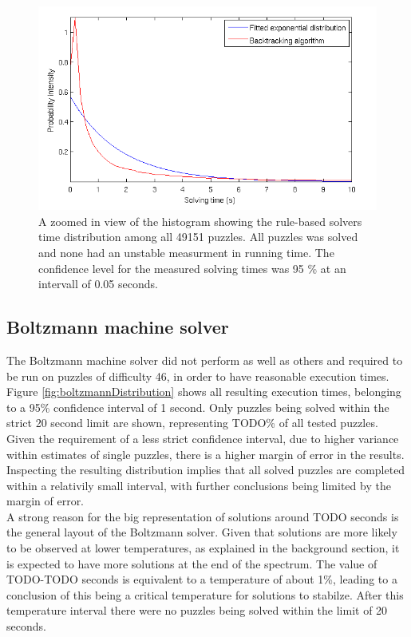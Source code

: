 \documentclass[a4paper,11pt]{kth-mag}
\begin{document}
\begin{figure}[here] 
\centering
\includegraphics[width=16cm]{images/backtrack_exponential.png}
\caption{A zoomed in view of the histogram showing the rule-based solvers time distribution among all 49151 puzzles. All puzzles was solved and none had an unstable measurment in running time. The confidence level for the measured solving times was 95 \% at an intervall of 0.05 seconds.}
\label{fig:rule-basedDistribution}
\end{figure}

\FloatBarrier
\subsection{Boltzmann machine solver}
The Boltzmann machine solver did not perform as well as others and required to be run on puzzles of difficulty 46, in order to have reasonable execution times.
Figure \ref{fig:boltzmannDistribution} shows all resulting execution times, belonging to a 95\% confidence interval of 1 second.
Only puzzles being solved within the strict 20 second limit are shown, representing TODO\% of all tested puzzles.
Given the requirement of a less strict confidence interval, due to higher variance within estimates of single puzzles, there is a higher margin of error in the results.
Inspecting the resulting distribution implies that all solved puzzles are completed within a relativily small interval, with further conclusions being limited by the margin of error. \\

A strong reason for the big representation of solutions around TODO seconds is the general layout of the Boltzmann solver.
Given that solutions are more likely to be observed at lower temperatures, as explained in the background section, it is expected to have more solutions at the end of the spectrum.
The value of TODO-TODO seconds is equivalent to a temperature of about 1\%, leading to a conclusion of this being a critical temperature for solutions to stabilze.
After this temperature interval there were no puzzles being solved within the limit of 20 seconds.
\end{document}
